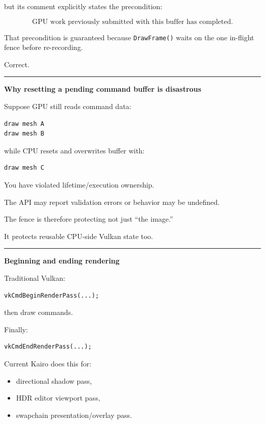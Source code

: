 but its comment explicitly states the precondition:

\[
\boxed{
\text{GPU work previously submitted with this buffer has completed}.
}
\]

That precondition is guaranteed because \texttt{DrawFrame()} waits on the one in-flight fence before re-recording.

Correct.

\begin{center}\rule{0.5\linewidth}{0.5pt}\end{center}

\textbf{Why resetting a pending command buffer is disastrous}

Suppose GPU still reads command data:

\begin{verbatim}
draw mesh A
draw mesh B
\end{verbatim}

while CPU resets and overwrites buffer with:

\begin{verbatim}
draw mesh C
\end{verbatim}

You have violated lifetime/execution ownership.

The API may report validation errors or behavior may be undefined.

The fence is therefore protecting not just ``the image.''

It protects reusable CPU-side Vulkan state too.

\begin{center}\rule{0.5\linewidth}{0.5pt}\end{center}

\textbf{Beginning and ending rendering}

Traditional Vulkan:

\begin{verbatim}
vkCmdBeginRenderPass(...);
\end{verbatim}

then draw commands.

Finally:

\begin{verbatim}
vkCmdEndRenderPass(...);
\end{verbatim}

Current Kairo does this for:

\begin{itemize}
\tightlist
\item
  directional shadow pass,
\item
  HDR editor viewport pass,
\item
  swapchain presentation/overlay pass.
\end{itemize}

